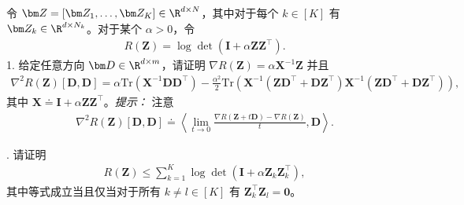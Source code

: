 \documentclass[../../book-main_zh.tex]{subfiles}
\begin{document}
\begin{exercise}
    令 $\bm Z = [\bm Z_1,\dots,\bm Z_K] \in \R^{d\times N}$，其中对于每个 $k \in [K]$ 有
    $\bm Z_k \in \R^{d\times N_k}$。对于某个 $\alpha > 0$，令
    \begin{align*}
        R(\bm Z) = \log\det\left(\bm I + \alpha\bm Z\bm Z^\top \right).
    \end{align*}
    1. 给定任意方向 $\bm D \in \R^{d\times m}$，请证明 $\nabla R(\bm Z) = \alpha\bm X^{-1}\bm Z$ 并且
    \begin{align*}
        \nabla^2 R(\bm Z)[\bm D, \bm D] =\alpha \mathrm{Tr}\left( \bm
        X^{-1}\bm D\bm D^\top\right) -
        \frac{\alpha^2}{2}\mathrm{Tr}\left(\bm X^{-1}\left( \bm Z\bm
            D^\top+\bm D\bm Z^\top\right) \bm X^{-1}\left( \bm Z\bm D^\top+\bm
        D\bm Z^\top\right)\right),
    \end{align*}
    其中 $\bm X \doteq \bm I + \alpha\bm Z\bm Z^\top$。{\em 提示：} 注意
    \begin{align*}
        \nabla^2 R(\bm Z)[\bm D, \bm D] \doteq \left\langle \lim_{t
        \to 0} \frac{\nabla R(\bm Z+ t\bm D) - \nabla R(\bm Z)}{t},
        \bm D \right\rangle.
    \end{align*}
    \smallskip

    . 请证明
    \begin{align*}
        R(\bm Z) \le \sum_{k=1}^K \log\det\left(\bm I + \alpha\bm
        Z_k\bm Z_k^\top \right),
    \end{align*}
    其中等式成立当且仅当对于所有 $k \neq l \in [K]$ 有 $\bm Z_k^\top\bm Z_l = \bm
    0$。
    \bigskip


\end{exercise}
\end{document}
